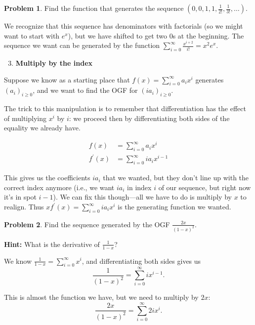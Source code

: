 \documentclass{article}
\theoremstyle{definition}
\newtheorem{problem}{Problem}
\begin{document}
\begin{problem}
Find the function that generates the sequence $\left(0,0,1,1, \frac{1}{2!}, \frac{1}{3!}, \ldots\right)$.
\end{problem}

We recognize that this sequence has denominators with factorials (so we might want to start with $e^{x}$), but we have shifted to get two 0s at the beginning. The sequence we want can be generated by the function $\sum_{i=0}^{\infty} \frac{x^{i+2}}{i!}=x^{2} e^{x}$.

\begin{enumerate}
\setcounter{enumi}{2}
\item \textbf{Multiply by the index}
\end{enumerate}

Suppose we know as a starting place that $f(x)=\sum_{i=0}^{\infty} a_{i} x^{i}$ generates $\left(a_{i}\right)_{i \geq 0}$, and we want to find the OGF for $\left(i a_{i}\right)_{i \geq 0}$.

The trick to this manipulation is to remember that differentiation has the effect of multiplying $x^{i}$ by $i$: we proceed then by differentiating both sides of the equality we already have.

\begin{align}
f(x) &= \sum_{i=0}^{\infty} a_{i} x^{i} \\
f^{\prime}(x) &= \sum_{i=0}^{\infty} i a_{i} x^{i-1}
\end{align}

This gives us the coefficients $i a_{i}$ that we wanted, but they don't line up with the correct index anymore (i.e., we want $i a_{i}$ in index $i$ of our sequence, but right now it's in spot $i-1$). We can fix this though---all we have to do is multiply by $x$ to realign. Thus $x f^{\prime}(x)=\sum_{i=0}^{\infty} i a_{i} x^{i}$ is the generating function we wanted.

\begin{problem}
Find the sequence generated by the OGF $\frac{2 x}{(1-x)^{2}}$.

\textbf{Hint:} What is the derivative of $\frac{1}{1-x}$?
\end{problem}

We know $\frac{1}{1-x}=\sum_{i=0}^{\infty} x^{i}$, and differentiating both sides gives us
\[\frac{1}{(1-x)^{2}}=\sum_{i=0}^{\infty} i x^{i-1}.\]

This is almost the function we have, but we need to multiply by $2 x$:
\[\frac{2 x}{(1-x)^{2}}=\sum_{i=0}^{\infty} 2 i x^{i}.\]
\end{document}
